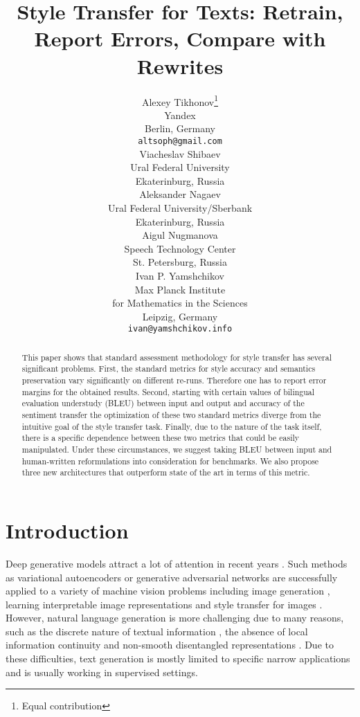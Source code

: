 \documentclass[11pt,a4paper]{article}
\title{Style Transfer for Texts: Retrain, Report Errors, Compare with Rewrites}
\author{Alexey Tikhonov\thanks{Equal contribution} \\
  Yandex \\
  Berlin, Germany \\
  \texttt{altsoph@gmail.com} \\\And
  Viacheslav Shibaev\footnotemark[1]  \\
  Ural Federal University \\
  Ekaterinburg, Russia \\\And
  Aleksander Nagaev  \\
  Ural Federal University/Sberbank \\
  Ekaterinburg, Russia \\\AND
  Aigul Nugmanova \\
  Speech Technology Center \\
  St. Petersburg, Russia \\\And
  Ivan P. Yamshchikov\footnotemark[1]  \\
  Max Planck Institute \\
  for Mathematics in the Sciences \\
  Leipzig, Germany \\
  \texttt{ivan@yamshchikov.info} \\}
\date{}
\begin{document}
\maketitle
\begin{abstract}
This paper shows that standard assessment methodology for style transfer has several significant problems. First, the standard metrics for style accuracy and semantics preservation vary significantly on different re-runs. Therefore one has to report error margins for the obtained results. Second, starting with certain values of bilingual evaluation understudy (BLEU) between input and output and accuracy of the sentiment transfer the optimization of these two standard metrics diverge from the intuitive goal of the style transfer task. Finally, due to the nature of the task itself, there is a specific dependence between these two metrics that could be easily manipulated. Under these circumstances, we suggest taking BLEU between input and human-written reformulations into consideration for benchmarks. We also propose three new architectures that outperform state of the art in terms of this metric.
\end{abstract}

\section{Introduction}
\label{intro}

Deep generative models attract a lot of attention in recent years \cite{hu17}. Such methods as variational autoencoders \cite{kingma13} or generative adversarial networks \cite{goodfellow} are successfully applied to a variety of machine vision problems including image generation \cite{Radford}, learning interpretable image representations \cite{Chen} and style transfer for images \cite{Gatys}. However, natural language generation is more challenging due to many reasons, such as the discrete nature of textual information \cite{hylsx}, the absence of local information continuity and non-smooth disentangled representations \cite{bowman}. Due to these difficulties, text generation is mostly limited to specific narrow applications and is usually working in supervised settings. 
\end{document}
